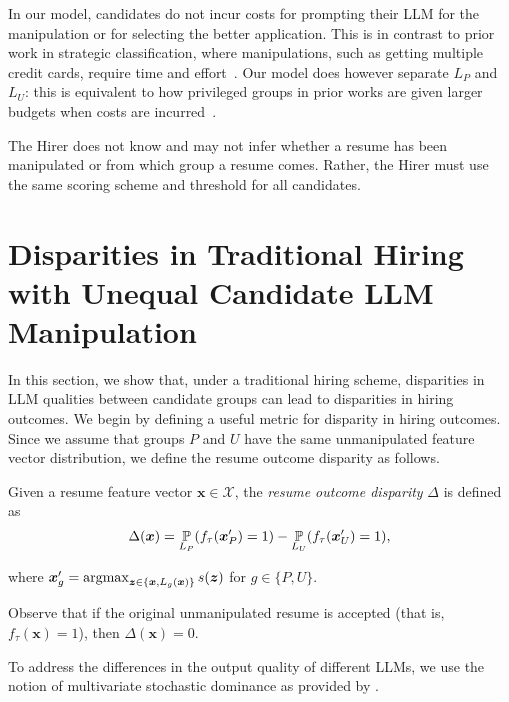     In our model, candidates do not incur costs for prompting their LLM for the manipulation or for selecting the better application. This is in contrast to prior work in strategic classification, where manipulations, such as getting multiple credit cards, require time and effort~\citep{Hardt2015}. Our model does however separate $L_P$ and $L_U$: this is equivalent to how privileged groups in prior works are given larger budgets when costs are incurred~\citep{milli2019social}. 
     
    The Hirer does not know and may not infer whether a resume has been manipulated or from which group a resume comes. Rather, the Hirer must use the same scoring scheme and threshold for all candidates.    
    
    
\section{Disparities in Traditional Hiring with Unequal Candidate LLM Manipulation}
\label{sec: disparities}
    In this section, we show that, under a traditional hiring scheme, disparities in LLM qualities between candidate groups can lead to disparities in hiring outcomes. We begin by defining a useful metric for disparity in hiring outcomes. Since we assume that groups \(P\) and \(U\) have the same unmanipulated feature vector distribution,  
    we define the resume outcome disparity as follows.
    \begin{definition}
        \label{def: resume outcome disparity}
        Given a resume feature vector \(\bm{x} \in \mathcal{X}\), the \emph{resume outcome disparity} $\Delta$ is defined as
        \begin{equation*}
            \Delta(\bm{x}) = \operatorname*{\mathbb{P}}_{L_P}(f_\tau(\bm{x}'_P) = 1) - \operatorname*{\mathbb{P}}_{L_U}(f_\tau(\bm{x}'_U) = 1), 
        \end{equation*}
        
        where \(\bm{x}'_g = \operatorname*{argmax}_{\bm{z} \in \{\bm{x}, L_g(\bm{x})\} } s(\bm{z})\) for \(g \in \{P, U\}\).
    \end{definition}


    Observe that if the original unmanipulated resume is accepted (that is, \(f_\tau(\bm{x}) = 1\)), then \(\Delta(\bm{x}) = 0\). 
    
    To address the differences in the output quality of different LLMs, we use the notion of multivariate stochastic dominance as provided by \citep{levhari1975efficiency}. 
    
